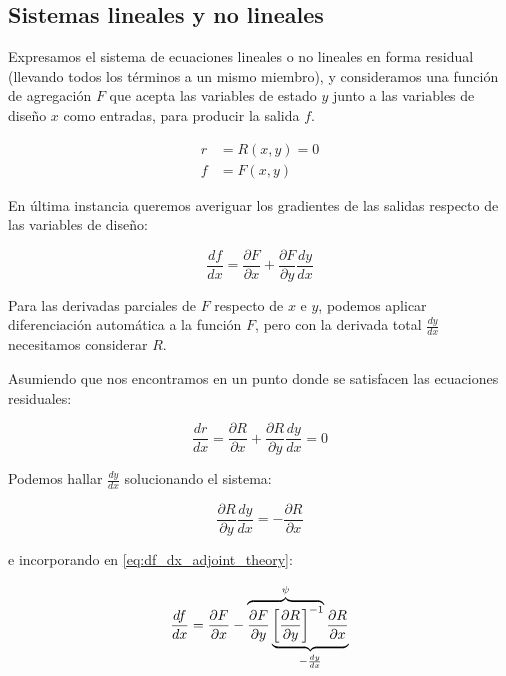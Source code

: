 \subsection{Sistemas lineales y no lineales}

Expresamos el sistema de ecuaciones lineales o no lineales en forma residual
(llevando todos los términos a un mismo miembro), y consideramos una función de
agregación $F$ que acepta las variables de estado $y$ junto a las variables de
diseño $x$ como entradas, para producir la salida $f$.

\begin{align}
	r & = R(x, y) = 0 \\
	f & = F(x, y)
\end{align}

En última instancia queremos averiguar los gradientes de las salidas
respecto de las variables de diseño:

\begin{equation} \label{eq:df_dx_adjoint_theory}
	\frac{df}{dx} = \frac{\partial F}{\partial x} + \frac{\partial F}{\partial y} \frac{dy}{dx}
\end{equation}

Para las derivadas parciales de $F$ respecto de $x$ e $y$, podemos aplicar
diferenciación automática a la función $F$, pero con la derivada total
$\frac{dy}{dx}$ necesitamos considerar $R$.

Asumiendo que nos encontramos en un punto donde se satisfacen las ecuaciones
residuales:

\begin{equation}
	\frac{dr}{dx} = \frac{\partial R}{\partial x} + \frac{\partial R}{\partial y} \frac{dy}{dx} = 0
\end{equation}

Podemos hallar $\frac{dy}{dx}$ solucionando el sistema:

\begin{equation} \label{eq:dy_dx_adjoint_theory}
	\frac{\partial R}{\partial y} \frac{dy}{dx} = - \frac{\partial R}{\partial x}
\end{equation}

e incorporando en \eqref{eq:df_dx_adjoint_theory}:

\begin{equation} \label{eq:df_dx_adjoint_two_ways}
	\frac{df}{dx} = \frac{\partial F}{\partial x} - \lefteqn{\overbrace{ \phantom{ \frac{\partial F}{\partial y} \left[\frac{\partial R}{\partial y}\right]^{-1} } }^{\psi} } \frac{\partial F}{\partial y}
	\underbrace{ \left[\frac{\partial R}{\partial y}\right]^{-1} \frac{\partial R}{\partial x} }_{-\frac{dy}{dx}}
\end{equation}

